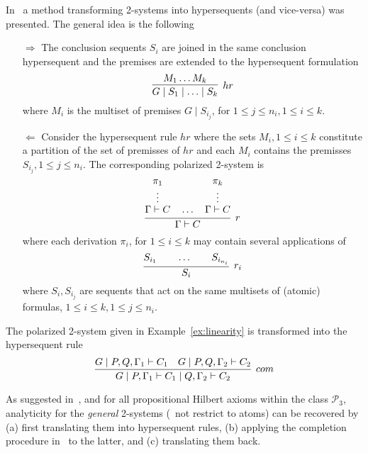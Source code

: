 
In~\cite{DBLP:journals/tocl/CiabattoniG18} a method transforming 2-systems into hypersequents (and vice-versa) was presented. The general idea is the following
\begin{itemize}
\item[$\Rightarrow$] The conclusion sequents $S_i$ are joined in the same conclusion hypersequent and the premises are extended to the hypersequent formulation
\[
\infer[hr]{G\mid S_1\mid \ldots \mid S_k}
{M_1 \ldots M_k}
\]
where $M_i$ is the multiset of premises $G\mid S_{i_j}$, for $1\leq j\leq n_i, 1\leq i\leq k$.
\item[$\Leftarrow$] Consider the hypersequent rule $hr$ where the sets $M_i, 1 \leq i \leq k$ constitute a partition of the set of premisses of $hr$ and each $M_i$ contains the premisses $S_{i_j}, 1\leq j\leq n_i$. The corresponding polarized 2-system is
\[
\infer[r]{\Gamma\vdash C}
      {\deduce{\Gamma\vdash C\strut}
              {\deduce{\vdots}
                      {\pi_1}}\quad\ldots\quad
       \deduce{\Gamma\vdash C\strut}
              {\deduce{\vdots}
                      {\pi_k}}}
\]
where each derivation $\pi_i$, for $1\leq i \leq k$ may contain several applications of
\[
\infer[r_i]{S_i}
{S_{i_1}\qquad\ldots\qquad S_{i_{n_i}}}
\]
where $S_i,S_{i_j}$ are sequents that act on the same multisets of (atomic) formulas, $1\leq i\leq k, 1\leq j\leq n_i$. %
\end{itemize}
\begin{example}
The polarized 2-system given in Example~\ref{ex:linearity} is transformed 
into the hypersequent rule
\[
\infer[com]{G\mid P,\Gamma_1\vdash C_1\mid Q,\Gamma_2\vdash C_2}
{G\mid P,Q,\Gamma_1\vdash C_1 & G\mid  P,Q,\Gamma_2\vdash C_2}
\]
\end{example}

As suggested in~\cite{DBLP:journals/tocl/CiabattoniG18}, and for all propositional Hilbert axioms within the class $\mathcal{P}_3$, analyticity for the {\em general} 2-systems (\ie\ not restrict to atoms) can be recovered by (a) first translating them into hypersequent rules, (b) applying the completion procedure in~\cite{DBLP:conf/lics/CiabattoniGT08} to the latter, and (c) translating them back. 



